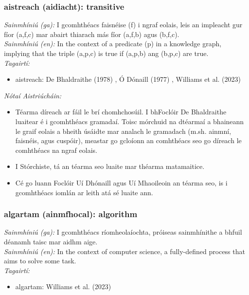 \documentclass{article}
\begin{document}
\subsubsection*{aistreach (aidiacht): transitive}
 \noindent \textit{Sainmhíniú (ga):} I gcomhthéacs faisnéise (f) i ngraf eolais, leis an impleacht gur fíor (a,f,c) mar abairt thiarach más fíor (a,f,b) agus (b,f,c).
\\
 \noindent \textit{Sainmhíniú (en):} In the context of a predicate (p) in a knowledge graph, implying that the triple (a,p,c) is true if (a,p,b) ang (b,p,c) are true.
\\
 \noindent \textit{Tagairtí:}
\begin{itemize}
	\item aistreach: De Bhaldraithe (1978) \cite{de-bhaldraithe}, Ó Dónaill (1977) \cite{odonaill}, Williams et al. (2023) \cite{storchiste}
\end{itemize}

 \noindent \textit{Nótaí Aistriúcháin:}
\begin{itemize}
	\item Téarma díreach ar fáil le brí chomhchosúil. I bhFoclóir De Bhaldraithe luaitear é i gcomhthéacs gramadaí. Toisc mórchuid na dtéarmaí a bhaineann le graif eolais a bheith úsáidte mar analach le gramadach (m.sh. ainmní, faisnéis, agus cuspóir), meastar go gcloíonn an comhthéacs seo go díreach le comhthéacs na ngraf eolais.
	\item I Stórchiste, tá an téarma seo luaite mar théarma matamaitice.
	\item Cé go luann Foclóir Uí Dhónaill agus Uí Mhaoileoin an téarma seo, is i gcomhthéacs iomlán ar leith atá sé luaite ann.
\end{itemize}


\subsubsection*{algartam (ainmfhocal): algorithm}
 \noindent \textit{Sainmhíniú (ga):} I gcomhthéacs ríomheolaíochta, próiseas sainmhínithe a bhfuil déanamh taisc mar aidhm aige.
\\
 \noindent \textit{Sainmhíniú (en):} In the context of computer science, a fully-defined process that aims to solve some task.
\\
 \noindent \textit{Tagairtí:}
\begin{itemize}
	\item algartam: Williams et al. (2023) \cite{storchiste}
\end{itemize}
\end{document}
